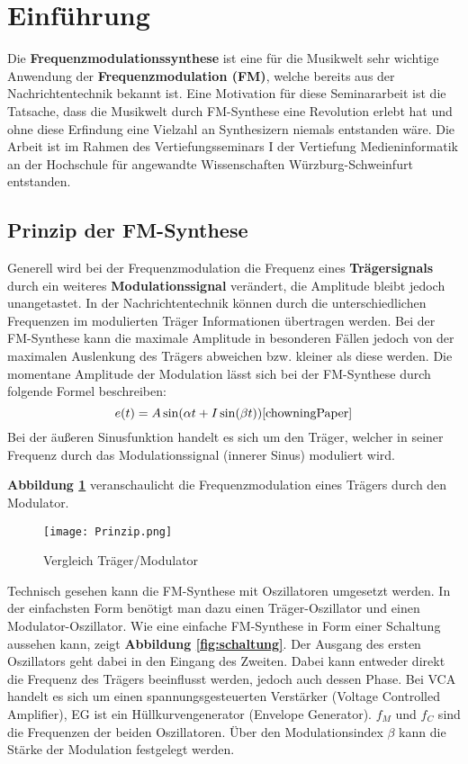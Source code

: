 \newpage
\section{Einführung}
Die \textbf{Frequenzmodulationssynthese} ist eine für die Musikwelt sehr wichtige Anwendung der \textbf{Frequenzmodulation (FM)}, welche bereits aus der Nachrichtentechnik bekannt ist. Eine Motivation für diese Seminararbeit ist die Tatsache, dass die Musikwelt durch FM-Synthese eine Revolution erlebt hat und ohne diese Erfindung eine Vielzahl an Synthesizern niemals entstanden wäre. Die Arbeit ist im Rahmen des Vertiefungsseminars I der Vertiefung Medieninformatik an der Hochschule für angewandte Wissenschaften Würzburg-Schweinfurt entstanden. %
\FloatBarrier
\subsection{Prinzip der FM-Synthese}
\label{PrinzipFM}
Generell wird bei der Frequenzmodulation die Frequenz eines \textbf{Trägersignals} durch ein weiteres \textbf{Modulationssignal} verändert, die Amplitude bleibt jedoch unangetastet. In der Nachrichtentechnik können durch die unterschiedlichen Frequenzen im modulierten Träger Informationen übertragen werden. Bei der FM-Synthese kann die maximale Amplitude in besonderen Fällen jedoch von der maximalen Auslenkung des Trägers abweichen bzw. kleiner als diese werden. 
Die momentane Amplitude der Modulation lässt sich bei der FM-Synthese durch folgende Formel beschreiben:
\begin{equation}
e(t) = A\sin(\alpha t + I\sin(\beta t)) \cite{chowningPaper}
\end{equation}
Bei der äußeren Sinusfunktion handelt es sich um den Träger, welcher in seiner Frequenz durch das Modulationssignal (innerer Sinus) moduliert wird.

\textbf{Abbildung \ref{fig:vergleichSignale}} veranschaulicht die Frequenzmodulation eines Trägers durch den Modulator.

\begin{figure} [ht]
\centering
  \texttt{[image: Prinzip.png]}
\caption{Vergleich Träger/Modulator}
\label{fig:vergleichSignale}
\end{figure}
\FloatBarrier

Technisch gesehen kann die FM-Synthese mit Oszillatoren umgesetzt werden. In der einfachsten Form benötigt man dazu einen Träger-Oszillator und einen Modulator-Oszillator. Wie eine einfache FM-Synthese in Form einer Schaltung aussehen kann, zeigt \textbf{Abbildung \ref{fig:schaltung}}. Der Ausgang des ersten Oszillators geht dabei in den Eingang des Zweiten. Dabei kann entweder direkt die Frequenz des Trägers beeinflusst werden, jedoch auch dessen Phase. Bei VCA handelt es sich um einen spannungsgesteuerten Verstärker (Voltage Controlled Amplifier), EG ist ein Hüllkurvengenerator (Envelope Generator). $f_M$ und $f_C$ sind die Frequenzen der beiden Oszillatoren. Über den Modulationsindex $\beta$ kann die Stärke der Modulation festgelegt werden. 

